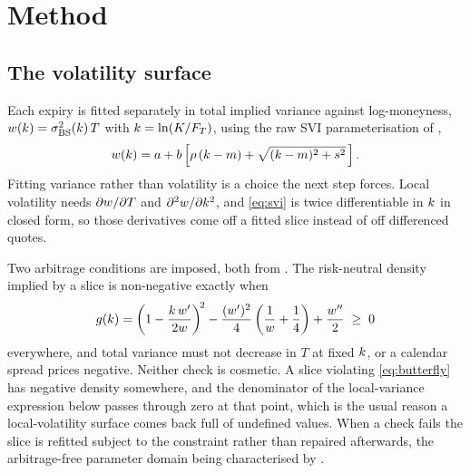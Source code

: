 \section{Method}\label{sec:method}

\subsection{The volatility surface}

Each expiry is fitted separately in total implied variance against
log-moneyness, $w(k) = \sigma_{\mathrm{BS}}^2(k)\,T$ with
$k = \ln(K/F_T)$, using the raw SVI parameterisation of
\citet{GatheralJacquier2014},
%
\begin{equation}
  w(k) = a + b\left[\rho\,(k - m)
      + \sqrt{(k - m)^2 + s^2}\,\right].
  \label{eq:svi}
\end{equation}
%
Fitting variance rather than volatility is a choice the next step forces. Local
volatility needs $\partial w/\partial T$ and
$\partial^2w/\partial k^2$, and \eqref{eq:svi} is twice differentiable
in $k$ in closed form, so those derivatives come off a fitted slice instead
of off differenced quotes.

Two arbitrage conditions are imposed, both from \citet{GatheralJacquier2014}.
The risk-neutral density implied by a slice is non-negative exactly when
%
\begin{equation}
  g(k) = \left(1 - \frac{k\,w'}{2w}\right)^{\!2}
    - \frac{(w')^2}{4}\left(\frac{1}{w} + \frac14\right)
    + \frac{w''}{2} \;\geq\; 0
  \label{eq:butterfly}
\end{equation}
%
everywhere, and total variance must not decrease in $T$ at fixed $k$, or a
calendar spread prices negative. Neither check is cosmetic. A slice violating
\eqref{eq:butterfly} has negative density somewhere, and the denominator of the
local-variance expression below passes through zero at that point, which is the
usual reason a local-volatility surface comes back full of undefined values.
When a check fails the slice is refitted subject to the constraint rather than
repaired afterwards, the arbitrage-free parameter domain being characterised by
\citet{MartiniMingone2022}.

